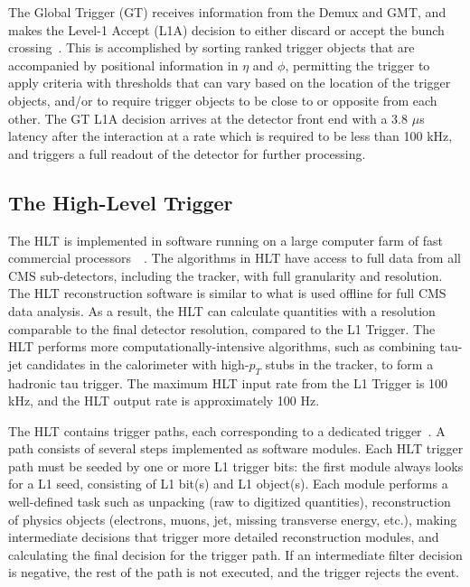 The Global Trigger (GT) receives information from the Demux and GMT, and makes the Level-1 Accept (L1A) decision to either discard or accept the bunch crossing~\cite{CERN-LHCC-2000-038}. This is accomplished by sorting ranked trigger objects that are accompanied by positional information in $\eta$ and $\phi$, permitting the trigger to apply criteria with thresholds that can vary based on the location of the trigger objects, and/or to require trigger objects to be close to or opposite from each other. The GT L1A decision arrives at the detector front end with a 3.8 $\mu$s latency after the interaction at a rate which is required to be less than 100 kHz, and triggers a full readout of the detector for further processing.



\subsection{The High-Level Trigger}
\label{section:phase-1-high-level-trigger}
The HLT is implemented in software running on a large computer farm of fast commercial processors~\cite{CMS-TDR-022-HLT}~\cite{Foudas:2008dt}. The algorithms in HLT have access to full data from all CMS sub-detectors, including the tracker, with full granularity and resolution. The HLT reconstruction software is similar to what is used offline for full CMS data analysis. As a result, the HLT can calculate quantities with a resolution comparable to the final detector resolution, compared to the L1 Trigger. The HLT performs more computationally-intensive algorithms, such as combining tau-jet candidates in the calorimeter with high-$p_T$ stubs in the tracker, to form a hadronic tau trigger. The maximum HLT input rate from the L1 Trigger is 100 kHz, and the HLT output rate is approximately 100 Hz. 

The HLT contains trigger paths, each corresponding to a dedicated trigger~\cite{twiki_SoftwareGuide_HLT}.  A path consists of several steps implemented as software modules. Each HLT trigger path must be seeded by one or more L1 trigger bits: the first module always looks for a L1 seed, consisting of L1 bit(s) and L1 object(s). Each module performs a well-defined task such as unpacking (raw to digitized quantities), reconstruction of physics objects (electrons, muons, jet, missing transverse energy, etc.), making intermediate decisions that trigger more detailed reconstruction modules, and calculating the final decision for the trigger path. If an intermediate filter decision is negative, the rest of the path is not executed, and the trigger rejects the event.


